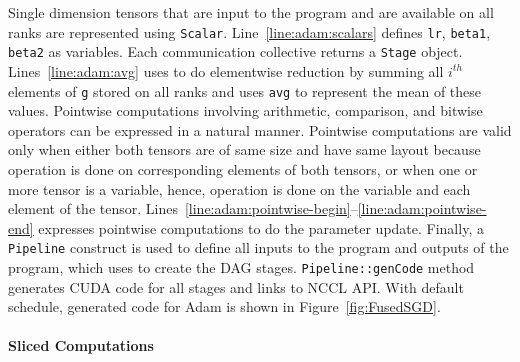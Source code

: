 Single dimension tensors that are input to the program and are available on all ranks are represented using \texttt{Scalar}.
Line~\ref{line:adam:scalars} defines \texttt{lr}, \texttt{beta1}, \texttt{beta2} as variables.
Each communication collective returns a \texttt{Stage} object. 
Lines~\ref{line:adam:avg} uses \allreduce to do elementwise reduction by summing all $i^{th}$ elements of \texttt{g} stored on all ranks and uses \texttt{avg} to represent the mean of these values.
Pointwise computations involving arithmetic, comparison, and bitwise operators can be expressed in a natural manner.
Pointwise computations are valid only when either both tensors are of same size and have same layout because operation is done on corresponding elements of both tensors, or when one or more tensor is a variable, hence, operation is done on the variable and each element of the tensor.
Lines~\ref{line:adam:pointwise-begin}--\ref{line:adam:pointwise-end} expresses pointwise computations to do the parameter update.
Finally, a \texttt{Pipeline} construct is used to define all inputs to the program and outputs of the program, which \tool uses to create the DAG stages.
\texttt{Pipeline::genCode} method generates CUDA code for all stages and links to NCCL API.
With default schedule, \tool generated code for  Adam is shown in Figure~\ref{fig:FusedSGD}.



\paragraph{Sliced Computations}

